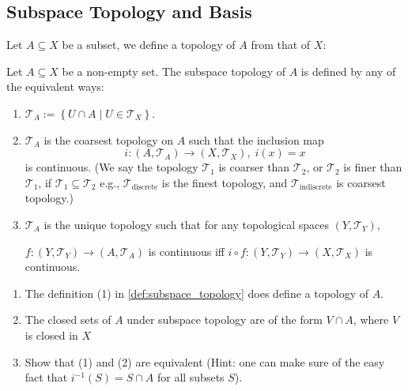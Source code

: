 \subsection{Subspace Topology and Basis}
Let $A \subseteq X$ be a subset, we define a topology of $A$ from that of $X$:
\begin{definition} \label{def:subspace_topology} Let \(A \subseteq  X\) be a non-empty set. The subspace topology of \(A\) is defined by any of the equivalent ways:
\begin{enumerate}
\item \({\mathcal{T}}_{A} := \left\{  {U \cap  A \mid  U \in  {\mathcal{T}}_{X}}\right\}.\)
\item $\mathcal{T}_A$ is the coarsest topology on \(A\) such that the inclusion map
\[
i : \left({A,{\mathcal{T}}_{A}}\right)  \rightarrow  \left({X,{\mathcal{T}}_X}\right),\;i\left(x\right)  = x
\]
is continuous. (We say the topology \({\mathcal{T}}_{1}\) is coarser than \({\mathcal{T}}_{2}\), or \({\mathcal{T}}_{2}\) is finer than \({\mathcal{T}}_{1}\), if \({\mathcal{T}}_{1} \subseteq  {\mathcal{T}}_{2}\) e.g., \({\mathcal{T}}_{\text{discrete}}\) is the finest topology, and \({\mathcal{T}}_{\text{indiscrete}}\) is coarsest topology.)

\item $\mathcal{T}_A$ is the unique topology such that for any topological spaces \(\left({Y,{\mathcal{T}}_Y}\right)\),
\begin{center}
$f : \left({Y,{\mathcal{T}}_Y}\right)  \rightarrow  \left({A,{\mathcal{T}}_{A}}\right)$ is continuous iff \(i \circ  f : \left({Y,{\mathcal{T}}_Y}\right)  \rightarrow  \left({X,{\mathcal{T}}_X}\right)\) is continuous.
\end{center}
\end{enumerate}
\end{definition}

\begin{exercise} \label{ex:subspace_topology}
\leavevmode
\begin{enumerate}
    \item The definition (1) in \autoref{def:subspace_topology} does define a topology of \(A\).
\item The closed sets of \(A\) under subspace topology are of the form \(V \cap  A\), where \(V\) is closed in \(X\)
\item Show that (1) and (2) are equivalent (Hint: one can make sure of the easy fact that \(
{i}^{-1}\left(S\right)  = S\cap A
\) for all subsets $S$).
\end{enumerate}
\end{exercise}

